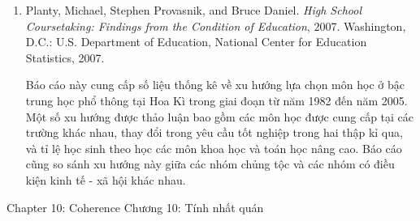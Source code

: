 {{\begin{enumerate}
          \par\noindent\hspace*{1em} Công trình này là báo cáo nghiên cứu so sánh bảy trường trung học công lập, trong đó bốn trường cho thấy sự tiến bộ vượt bậc của học sinh bước vào trung học với mức độ học tập kém hơn đáng kể so với bạn bè cùng trang lứa. Bốn trường điển hình này được so sánh với các trường có mức tăng trưởng trung bình. Các trường trong nghiên cứu có đặc điểm dân số tương tự nhau, với đa số học sinh thuộc nhóm thiểu số và có hoàn cảnh kinh tế - xã hội khó khăn. Nghiên cứu làm rõ cách tiếp cận đã được áp dụng tại các trường đạt kết quả thành công.\vspace{.35\baselineskip}

        \item Planty, Michael, Stephen Provasnik, and Bruce Daniel. \emph{High School Coursetaking: Findings from the Condition of Education}, 2007. Washington, D.C.: U.S. Department of Education, National Center for Education Statistics, 2007.\vspace{.25\baselineskip}

          \par\noindent\hspace*{1em} Báo cáo này cung cấp số liệu thống kê về xu hướng lựa chọn môn học ở bậc trung học phổ thông tại Hoa Kì trong giai đoạn từ năm 1982 đến năm 2005. Một số xu hướng được thảo luận bao gồm các môn học được cung cấp tại các trường khác nhau, thay đổi trong yêu cầu tốt nghiệp trong hai thập kỉ qua, và tỉ lệ học sinh theo học các môn khoa học và toán học nâng cao. Báo cáo cũng so sánh xu hướng này giữa các nhóm chủng tộc và các nhóm có điều kiện kinh tế - xã hội khác nhau.
      \end{enumerate}}
  }{\NOTE{}}

\ParallelSection
  {Chapter 10: Coherence}
  {Chương 10: Tính nhất quán}
  {}

